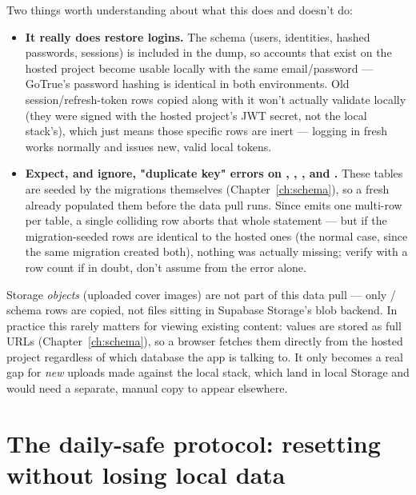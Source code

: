 Two things worth understanding about what this does and doesn't do:

\begin{itemize}
  \item \textbf{It really does restore logins.} The  schema (users, identities, hashed passwords, sessions) is included in the dump, so accounts that exist on the hosted project become usable locally with the same email/password — GoTrue's password hashing is identical in both environments. Old session/refresh-token rows copied along with it won't actually validate locally (they were signed with the hosted project's JWT secret, not the local stack's), which just means those specific rows are inert — logging in fresh works normally and issues new, valid local tokens.
  \item \textbf{Expect, and ignore, "duplicate key" errors on , , , and .} These tables are seeded by the migrations themselves (Chapter~\ref{ch:schema}), so a fresh  already populated them before the data pull runs. Since  emits one multi-row  per table, a single colliding row aborts that whole statement — but if the migration-seeded rows are identical to the hosted ones (the normal case, since the same migration created both), nothing was actually missing; verify with a row count if in doubt, don't assume from the error alone.
\end{itemize}

\begin{olkwarn}
Storage \emph{objects} (uploaded cover images) are not part of this data pull — only / schema rows are copied, not files sitting in Supabase Storage's blob backend. In practice this rarely matters for viewing existing content:  values are stored as full  URLs (Chapter~\ref{ch:schema}), so a browser fetches them directly from the hosted project regardless of which database the app is talking to. It only becomes a real gap for \emph{new} uploads made against the local stack, which land in local Storage and would need a separate, manual copy to appear elsewhere.
\end{olkwarn}

\section{The daily-safe protocol: resetting without losing local data}
\label{sec:reset-full}

